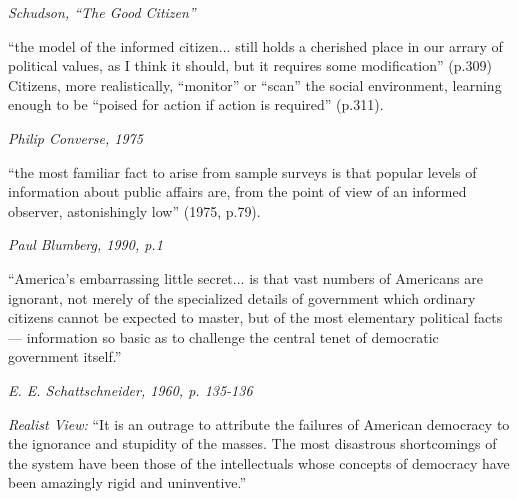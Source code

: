 \documentclass[12pt]{article}
\begin{document}
\hfill 

\textit{Schudson, ``The Good Citizen''}

``the model of the informed citizen... still holds a cherished place in our arrary of political values, as I think it should, but it requires some modification'' (p.309) Citizens, more realistically, ``monitor'' or ``scan'' the social environment, learning enough to be ``poised for action if action is required'' (p.311).  

\hfill 

\textit{Philip Converse, 1975}

``the most familiar fact to arise from sample surveys is that popular levels of information about public affairs are, from the point of view of an informed observer, astonishingly low'' (1975, p.79).  

\hfill 

\textit{Paul Blumberg, 1990, p.1}

``America's embarrassing little secret... is that vast numbers of Americans are ignorant, not merely of the specialized details of government which ordinary citizens cannot be expected to master, but of the most elementary political facts --- information so basic as to challenge the central tenet of democratic government itself.''  

\hfill 

\textit{E. E. Schattschneider, 1960, p. 135-136}

\textit{Realist View:} ``It is an outrage to attribute the failures of American democracy to the ignorance and stupidity of the masses. The most disastrous shortcomings of the system have been those of the intellectuals whose concepts of democracy have been amazingly rigid and uninventive.'' 




\clearpage  %
\printindex %
\end{document}
